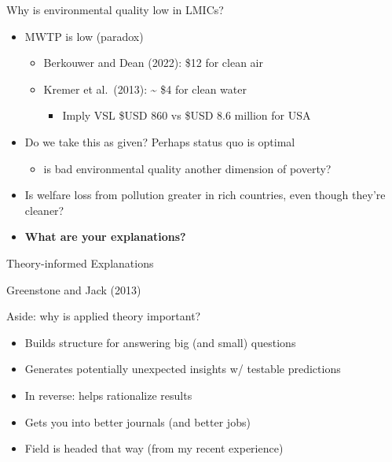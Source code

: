 \documentclass[
  ignorenonframetext,
  aspectratio=169]{beamer}
\providecommand{\tightlist}{%
  \setlength{\itemsep}{0pt}\setlength{\parskip}{0pt}}
\begin{document}
\begin{frame}{Why is environmental quality low in LMICs?}
\protect\hypertarget{why-is-environmental-quality-low-in-lmics}{}
\begin{itemize}
\item
  MWTP is low (paradox)

  \begin{itemize}
  \tightlist
  \item
    Berkouwer and Dean (2022): \$12 for clean air
  \item
    Kremer et al.~(2013): \textasciitilde{} \$4 for clean water

    \begin{itemize}
    \tightlist
    \item
      Imply VSL \$USD 860 vs \$USD 8.6 million for USA
    \end{itemize}
  \end{itemize}
\item
  Do we take this as given? Perhaps status quo is optimal

  \begin{itemize}
  \tightlist
  \item
    is bad environmental quality another dimension of poverty?
  \end{itemize}
\item
  Is welfare loss from pollution greater in rich countries, even though
  they're cleaner?
\item
  \textbf{What are your explanations?}
\end{itemize}
\end{frame}

\begin{frame}{}
\protect\hypertarget{section-5}{}
\centering

\Huge Theory-informed Explanations

\large Greenstone and Jack (2013)
\end{frame}

\begin{frame}{Aside: why is applied theory important?}
\protect\hypertarget{aside-why-is-applied-theory-important}{}
\begin{itemize}
\item
  Builds structure for answering big (and small) questions
\item
  Generates potentially unexpected insights w/ testable predictions
\item
  In reverse: helps rationalize results
\item
  Gets you into better journals (and better jobs)
\item
  Field is headed that way (from my recent experience)
\end{itemize}
\end{frame}
\end{document}

